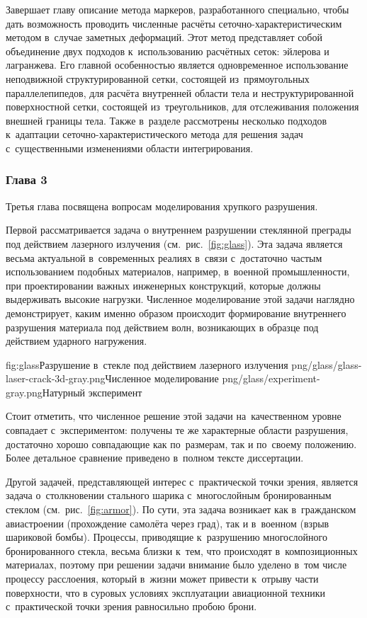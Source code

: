 \documentclass[a4paper,14pt]{extarticle}
\numberwithin{equation}{section}
\begin{document}
        Завершает главу описание метода маркеров, разработанного специально, чтобы дать возможность проводить численные
        расчёты сеточно-характеристическим методом в~случае заметных деформаций. Этот метод представляет собой объединение
        двух подходов к~использованию расчётных сеток: эйлерова и лагранжева. Его главной особенностью является
        одновременное использование неподвижной структурированной сетки, состоящей из~прямоугольных параллелепипедов,
        для расчёта внутренней области тела и неструктурированной поверхностной сетки, состоящей из~треугольников, для
        отслеживания положения внешней границы тела. Также в~разделе рассмотрены несколько подходов к~адаптации
        сеточно-ха\-рак\-те\-рис\-ти\-чес\-ко\-го метода для решения задач с~существенными изменениями области
        интегрирования.

        \subsubsection*{Глава 3}

        Третья глава посвящена вопросам моделирования хрупкого разрушения.

        Первой рассматривается задача о внутреннем разрушении стеклянной преграды под действием лазерного излучения (см.~рис.~\ref{fig:glass}).
        Эта задача является весьма актуальной в~современных реалиях в~связи с~достаточно частым использованием подобных
        материалов, например, в~военной промышленности, при проектировании важных инженерных конструкций,
        которые должны выдерживать высокие нагрузки. Численное моделирование этой задачи наглядно демонстрирует,
        каким именно образом происходит формирование внутреннего разрушения материала под действием волн, возникающих в
        образце под действием ударного нагружения.

       \twofigsH
            {fig:glass}{Разрушение в~стекле под действием лазерного излучения}
            {png/glass/glass-laser-crack-3d-gray.png}{Численное моделирование}
            {png/glass/experiment-gray.png}{Натурный эксперимент}

        Стоит отметить, что численное решение этой задачи на~качественном уровне совпадает с~экспериментом: получены те
        же характерные области разрушения, достаточно хорошо совпадающие как по~размерам, так и по~своему положению.
        Более детальное сравнение приведено в~полном тексте диссертации.

        Другой задачей, представляющей интерес с~практической точки зрения, является задача о~столкновении стального
        шарика с~многослойным бронированным стеклом (см.~рис.~\ref{fig:armor}). По сути, эта задача возникает как
        в~гражданском авиастроении (прохождение самолёта через град), так и в~военном (взрыв шариковой бомбы). Процессы,
        приводящие к~разрушению многослойного бронированного стекла, весьма близки к~тем, что происходят
        в~композиционных материалах, поэтому при решении задачи внимание было уделено в~том числе процессу расслоения,
        который в~жизни может привести к~отрыву части поверхности, что в суровых условиях эксплуатации авиационной
        техники с~практической точки зрения равносильно пробою брони.
\end{document}
